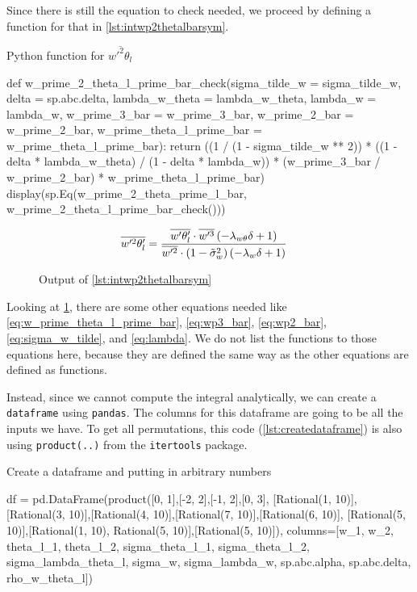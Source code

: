 Since there is still the equation to check needed,
we proceed by defining a function for that in \cref{lst:intwp2thetalbarsym}.
\begin{listing}[!ht]
    \caption{Python function for $\overline{w'^2\theta_l}$}
    \label{lst:intwp2thetalbarsym}
    \begin{pythoncode}
        def w_prime_2_theta_l_prime_bar_check(sigma_tilde_w = sigma_tilde_w,
            delta = sp.abc.delta, lambda_w_theta = lambda_w_theta, lambda_w = lambda_w,
            w_prime_3_bar = w_prime_3_bar, w_prime_2_bar = w_prime_2_bar,
            w_prime_theta_l_prime_bar = w_prime_theta_l_prime_bar):
            return ((1 / (1 - sigma_tilde_w ** 2)) *
                ((1 - delta * lambda_w_theta) / (1 - delta * lambda_w)) *
                (w_prime_3_bar / w_prime_2_bar) *
                w_prime_theta_l_prime_bar)
        display(sp.Eq(w_prime_2_theta_prime_l_bar, w_prime_2_theta_l_prime_bar_check()))
    \end{pythoncode}
\end{listing}
\begin{figure}[!ht]
    \centering
    \caption{Output of \cref{lst:intwp2thetalbarsym}}
    \label{fig:intwp2thetalbarsymout}
    \begin{align}
        \nonumber
        \overline{w'^2\theta'_l}
        &= \frac{\overline{w'\theta'_l} \cdot \overline{w'^3} \left(- \lambda_{w\theta} \delta + 1\right)}{\overline{w'^2} \cdot \left(1 - {\tilde{\sigma}_w}^{2}\right) \left(- \lambda_{w} \delta + 1\right)}
    \end{align}
\end{figure}
Looking at \cref{fig:intwp2thetalbarsymout},
there are some other equations needed like \cref{eq:w_prime_theta_l_prime_bar},
\cref{eq:wp3_bar}, \cref{eq:wp2_bar}, \cref{eq:sigma_w_tilde}, and \cref{eq:lambda}.
We do not list the functions to those equations here,
because they are defined the same way as the other equations are defined as functions.

Instead, since we cannot compute the integral analytically,
we can create a \texttt{dataframe}
using \texttt{pandas}\autocite{mckinney-proc-scipy-2010}.
The columns for this dataframe are going to be all the inputs we have.
To get all permutations,
this code (\cref{lst:createdataframe}) is also using \texttt{product(..)}
from the \texttt{itertools} package.
\begin{listing}[!ht]
    \caption{Create a dataframe and putting in arbitrary numbers}
    \label{lst:createdataframe}
    \begin{pythoncode}
        df = pd.DataFrame(product([0, 1],[-2, 2],[-1, 2],[0, 3], [Rational(1, 10)],
            [Rational(3, 10)],[Rational(4, 10)],[Rational(7, 10)],[Rational(6, 10)],
            [Rational(5, 10)],[Rational(1, 10), Rational(5, 10)],[Rational(5, 10)]),
            columns=[w_1, w_2, theta_l_1, theta_l_2, sigma_theta_l_1, sigma_theta_l_2,
            sigma_lambda_theta_l, sigma_w, sigma_lambda_w, sp.abc.alpha, sp.abc.delta,
            rho_w_theta_l])
    \end{pythoncode}
\end{listing}

